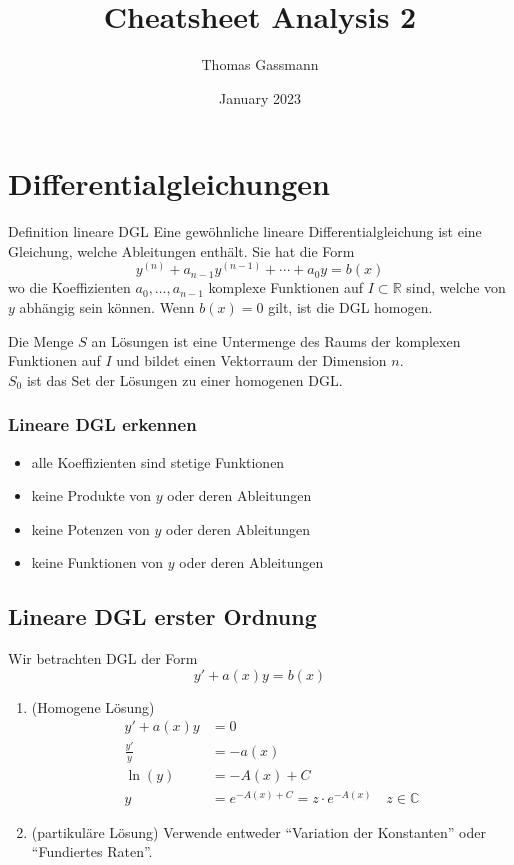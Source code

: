 \documentclass[a4paper,10pt]{article}
\title{Cheatsheet Analysis 2}
\author{Thomas Gassmann}
\date{January 2023}
\def\R{\mathbb{R}}
\def\C{\mathbb{C}}
\begin{document}


\section{Differentialgleichungen}
\begin{mainbox}{Definition lineare DGL}
  Eine gewöhnliche lineare Differentialgleichung ist eine Gleichung, welche Ableitungen enthält. Sie hat die Form \[y^{(n)} + a_{n-1} y^{(n-1)} + \cdots + a_0y = b(x)\]
  wo die Koeffizienten \(a_0, \ldots, a_{n-1}\) komplexe Funktionen auf \(I \subset \R\) sind, welche von \(y\) abhängig sein können. Wenn \(b(x) = 0\) gilt, ist die DGL homogen.
\end{mainbox}

Die Menge $S$ an Lösungen ist eine Untermenge des Raums der komplexen Funktionen auf $I$ und bildet einen Vektorraum der Dimension $n$.\\
\(S_0\) ist das Set der Lösungen zu einer homogenen DGL.

\subsubsection*{Lineare DGL erkennen}
\begin{itemize}
  \item alle Koeffizienten sind stetige Funktionen
  \item keine Produkte von $y$ oder deren Ableitungen
  \item keine Potenzen von $y$ oder deren Ableitungen
  \item keine Funktionen von $y$ oder deren Ableitungen
\end{itemize}

\subsection{Lineare DGL erster Ordnung}
Wir betrachten DGL der Form \[y' + a(x)y = b(x)\]
\begin{enumerate}
  \item (Homogene Lösung) 
  \begin{align*}
    y' + a(x)y &= 0\\
    \frac{y'}{y} &= -a(x)\\
    \ln(y) &= -A(x)+C\\
    y &= e^{-A(x)+C} = z \cdot e^{-A(x)}\quad z \in \C
  \end{align*}
  \item (partikuläre Lösung) Verwende entweder ``Variation der Konstanten'' oder ``Fundiertes Raten''.
\end{enumerate}
\end{document}
